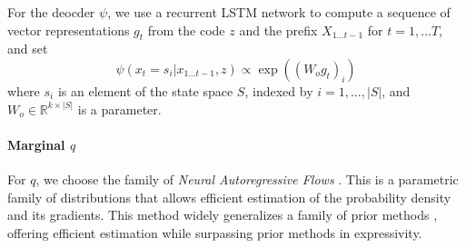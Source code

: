 \documentclass[11pt,letterpaper]{article}
\begin{document}
For the deocder $\psi$, we use a recurrent LSTM network to compute a sequence of vector representations $g_t$ from the code $z$ and the prefix $X_{1\dots t-1}$ for $t = 1, \dots T$, and set
\begin{equation}
	\psi(x_t = s_i|x_{1...t-1}, z) \propto \exp((W_o g_t)_i)
\end{equation}
where $s_i$ is an element of the state space $S$, indexed by $i=1, ..., |S|$, and $W_o \in \mathbb{R}^{k \times |S|}$ is a parameter.




%

\paragraph{Marginal $q$}
For $q$, we choose the family of \emph{Neural Autoregressive Flows} \citep{huang-neural-2018}. 
This is a parametric family of distributions that allows efficient estimation of the probability density and its gradients.
This method widely generalizes a family of prior methods \citep{rezende-variational-2015, kingma-improving-2016, papamakarios-masked-2017}, offering efficient estimation while surpassing prior methods in expressivity.


%
%
\end{document}
